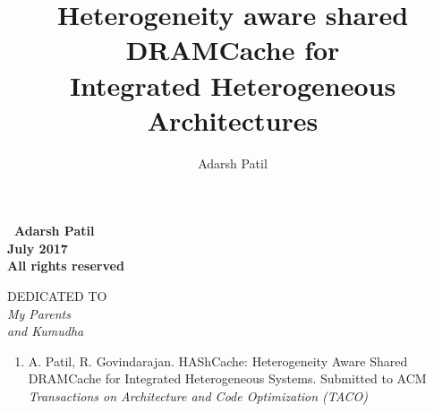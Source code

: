 \documentclass[12pt,twoside,a4paper, openright]{report}
\newcommand{\cachename}{HAShCache}
\begin{document}
\begin{frontmatter}
\title{Heterogeneity aware shared DRAMCache for \\ Integrated Heterogeneous Architectures}
\author{Adarsh Patil}
\enggfaculty
\mscengg
\iisclogotrue %
\figurespagefalse %
\tablespagetrue %
\maketitle

\vspace*{\fill}
\vspace{10em}
\begin{center}
	\Large\bf \textcopyright \ Adarsh Patil\\
	\Large\bf July 2017\\
	\Large\bf All rights reserved
\end{center}
\vspace*{\fill}
\thispagestyle{empty}


\begin{dedication}
\newpage
\vspace*{\fill}
\begin{center}
	DEDICATED TO \\
	\Large\it My Parents  \\
	\Large\it and Kumudha
\end{center}
\vspace*{\fill}
\thispagestyle{empty}
\newpage
\thispagestyle{empty}
\end{dedication}


\acknowledgements
{}



\publications
\begin{enumerate}
	\item A. Patil, R. Govindarajan. \cachename: Heterogeneity Aware Shared DRAMCache for Integrated Heterogeneous Systems. Submitted to ACM \textit{Transactions on Architecture and Code Optimization (TACO)}
\end{enumerate}



\begin{abstract}

\end{abstract}

\makecontents

	
\cleardoublepage
{}
\listoffigures

\newpage
{}
\listofalgorithms
\newpage
\thispagestyle{empty}
\cleardoublepage


\end{frontmatter}















\end{document}
